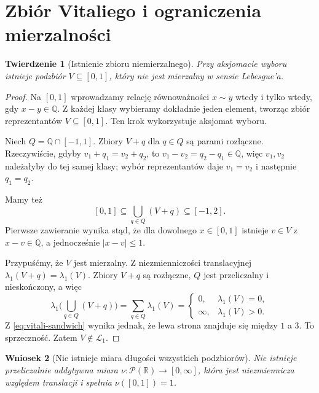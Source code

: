 \documentclass[11pt,a4paper,oneside]{book}
\numberwithin{equation}{chapter}
\theoremstyle{plain}
\newtheorem{twierdzenie}{Twierdzenie}[chapter]
\newtheorem{wniosek}[twierdzenie]{Wniosek}
\theoremstyle{definition}
\theoremstyle{remark}
\begin{document}
\section{Zbiór Vitaliego i ograniczenia mierzalności}

\begin{twierdzenie}[Istnienie zbioru niemierzalnego]
\label{thm:vitali}
Przy aksjomacie wyboru istnieje podzbiór
$V\subseteq[0,1]$, który nie jest mierzalny
w sensie Lebesgue'a.
\end{twierdzenie}

\begin{proof}
Na $[0,1]$ wprowadzamy relację równoważności
$x\sim y$ wtedy i tylko wtedy, gdy $x-y\in\mathbb Q$.
Z każdej klasy wybieramy dokładnie jeden element,
tworząc zbiór reprezentantów $V\subseteq[0,1]$.
Ten krok wykorzystuje aksjomat wyboru.

Niech $Q=\mathbb Q\cap[-1,1]$. Zbiory $V+q$ dla
$q\in Q$ są parami rozłączne. Rzeczywiście, gdyby
$v_1+q_1=v_2+q_2$, to
$v_1-v_2=q_2-q_1\in\mathbb Q$, więc $v_1,v_2$
należałyby do tej samej klasy; wybór reprezentantów
daje $v_1=v_2$ i następnie $q_1=q_2$.

Mamy też
\begin{equation}\label{eq:vitali-sandwich}
[0,1]\subseteq\bigcup_{q\in Q}(V+q)\subseteq[-1,2].
\end{equation}
Pierwsze zawieranie wynika stąd, że dla dowolnego
$x\in[0,1]$ istnieje $v\in V$ z $x-v\in\mathbb Q$,
a jednocześnie $|x-v|\le1$.

Przypuśćmy, że $V$ jest mierzalny. Z niezmienniczości
translacyjnej $\lambda_1(V+q)=\lambda_1(V)$.
Zbiory $V+q$ są rozłączne, $Q$ jest przeliczalny i
nieskończony, a więc
\[
\lambda_1\Big(\bigcup_{q\in Q}(V+q)\Big)
=\sum_{q\in Q}\lambda_1(V)
=\begin{cases}0,&\lambda_1(V)=0,\\
\infty,&\lambda_1(V)>0.
\end{cases}
\]
Z \eqref{eq:vitali-sandwich} wynika jednak, że lewa
strona znajduje się między $1$ a $3$. To sprzeczność.
Zatem $V\notin\mathcal L_1$.
\end{proof}

\begin{wniosek}[Nie istnieje miara długości wszystkich podzbiorów]
\label{cor:no-all-subsets-invariant}
Nie istnieje przeliczalnie addytywna miara
$\nu:\mathcal P(\mathbb R)\to[0,\infty]$, która
jest niezmiennicza względem translacji i spełnia
$\nu([0,1])=1$.
\end{wniosek}
\end{document}
